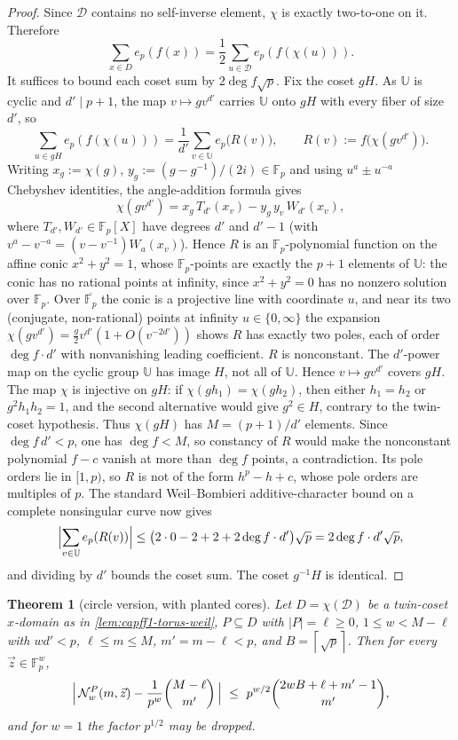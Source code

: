 \documentclass[11pt]{article}
\newtheorem{theorem}{Theorem}[section]
\theoremstyle{definition}
\theoremstyle{remark}
\newcommand{\F}{\mathbb{F}}
\newcommand{\UU}{\mathbb{U}}
\providecommand{\ceil}[1]{\left\lceil #1\right\rceil}
\begin{document}
\begin{proof}
Since $\mathcal D$ contains no self-inverse element, $\chi$ is exactly two-to-one on it.  Therefore
\[
\sum_{x\in D}e_p(f(x))
=\frac12\sum_{u\in\mathcal D}e_p(f(\chi(u))).
\]
It suffices to bound each coset sum by $2\deg f\sqrt p$.  Fix the coset $gH$.  As $\UU$ is cyclic and $d'\mid p+1$, the map $v\mapsto gv^{d'}$ carries $\UU$ onto $gH$ with every fiber of size $d'$, so
\[
\sum_{u\in gH}e_p(f(\chi(u)))
=\frac1{d'}\sum_{v\in\UU}e_p\bigl(R(v)\bigr),
\qquad R(v):=f\bigl(\chi(gv^{d'})\bigr).
\]
Writing $x_g:=\chi(g)$, $y_g:=(g-g^{-1})/(2i)\in\F_p$ and using $u^{a}\pm u^{-a}$ Chebyshev identities, the angle-addition formula gives
\[
        \chi(gv^{d'})=x_g\,T_{d'}(x_v)-y_g\,y_v\,W_{d'}(x_v),
\]
where $T_{d'},W_{d'}\in\F_p[X]$ have degrees $d'$ and $d'-1$ \textup{(with $v^{a}-v^{-a}=(v-v^{-1})W_a(x_v)$)}.  Hence $R$ is an $\F_p$-polynomial function on the affine conic $x^2+y^2=1$, whose $\F_p$-points are exactly the $p+1$ elements of $\UU$: the conic has no rational points at infinity, since $x^2+y^2=0$ has no nonzero solution over $\F_p$.  Over $\overline{\F_p}$ the conic is a projective line with coordinate $u$, and near its two \textup{(conjugate, non-rational)} points at infinity $u\in\{0,\infty\}$ the expansion $\chi(gv^{d'})=\tfrac g2v^{d'}(1+O(v^{-2d'}))$ shows $R$ has exactly two poles, each of order $\deg f\cdot d'$ with nonvanishing leading coefficient.  $R$ is nonconstant.  The $d'$-power map on the cyclic group $\UU$ has image $H$, not all of $\UU$.  Hence $v\mapsto gv^{d'}$ covers $gH$.  The map $\chi$ is injective on $gH$: if $\chi(gh_1)=\chi(gh_2)$, then either $h_1=h_2$ or $g^2h_1h_2=1$, and the second alternative would give $g^2\in H$, contrary to the twin-coset hypothesis.  Thus $\chi(gH)$ has $M=(p+1)/d'$ elements.  Since $\deg f\,d'<p$, one has $\deg f<M$, so constancy of $R$ would make the nonconstant polynomial $f-c$ vanish at more than $\deg f$ points, a contradiction.  Its pole orders lie in $[1,p)$, so $R$ is not of the form $h^p-h+c$, whose pole orders are multiples of $p$.  The standard Weil--Bombieri additive-character bound on a complete nonsingular curve \cite[Ch.~6]{Schmidt76} now gives
\[
        \Bigl|\sum_{v\in\UU}e_p(R(v))\Bigr|\le\bigl(2\cdot0-2+2+2\deg f\cdot d'\bigr)\sqrt p=2\deg f\cdot d'\sqrt p,
\]
and dividing by $d'$ bounds the coset sum.  The coset $g^{-1}H$ is identical.
\end{proof}

\begin{theorem}[circle version, with planted cores]\label{thm:capff1-collision-circle}
Let $D=\chi(\mathcal D)$ be a twin-coset $x$-domain as in \cref{lem:capff1-torus-weil}, $P\subseteq D$ with $|P|=\ell\ge0$, $1\le w<M-\ell$ with $wd'<p$, $\ell\le m\le M$, $m'=m-\ell<p$, and $B=\ceil{\sqrt p}$.  Then for every $\vec z\in\F_p^w$,
\[
        \Bigl|\,\mathcal N_w^P(m,\vec z)-\frac1{p^w}\binom{M-\ell}{m'}\,\Bigr|
        \ \le\ p^{w/2}\binom{2wB+\ell+m'-1}{m'},
\]
and for $w=1$ the factor $p^{1/2}$ may be dropped.
\end{theorem}
\end{document}

